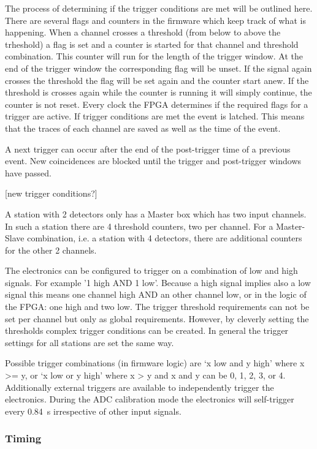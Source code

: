 The process of determining if the trigger conditions are met will be outlined here. There are several flags and counters in the firmware which keep track of what is happening. When a channel crosses a threshold (from below to above the trheshold) a flag is set and a counter is started for that channel and threshold combination. This counter will run for the length of the trigger window. At the end of the trigger window the corresponding flag will be unset. If the signal again crosses the threshold the flag will be set again and the counter start anew. If the threshold is crosses again while the counter is running it will simply continue, the counter is not reset. Every clock the FPGA determines if the required flags for a trigger are active. If trigger conditions are met the event is latched. This means that the traces of each channel are saved as well as the time of the event.

A next trigger can occur after the end of the post-trigger time of a previous event. New coincidences are blocked until the trigger and post-trigger windows have passed.

[new trigger conditions?]

A station with 2 detectors only has a Master box which has two input channels. In such a station there are 4 threshold counters, two per channel. For a Master-Slave combination, i.e. a station with 4 detectors, there are additional counters for the other 2 channels.

The electronics can be configured to trigger on a combination of low and high signals. For example '1 high AND 1 low'. Because a high signal implies also a low signal this means one channel high AND an other channel low, or in the logic of the FPGA: one high and two low. The trigger threshold requirements can not be set per channel but only as global requirements. However, by cleverly setting the thresholds complex trigger conditions can be created. In general the trigger settings for all stations are set the same way.

Possible trigger combinations (in firmware logic) are `x low and y high' where x >= y, or `x low or y high' where  x > y and x and y can be 0, 1, 2, 3, or 4. Additionally external triggers are available to independently trigger the electronics. During the ADC calibration mode the electronics will self-trigger every \SI{.84}{\second} irrespective of other input signals.


\subsubsection{Timing}

